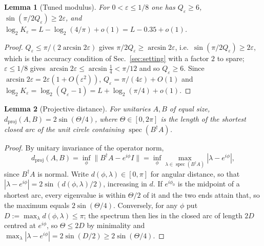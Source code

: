 \documentclass[aps,prx,twocolumn,superscriptaddress,nofootinbib,longbibliography]{revtex4-2}
\theoremstyle{plain}
\newtheorem{lemma}{Lemma}
\theoremstyle{definition}
\theoremstyle{remark}
\newcommand{\dproj}{d_{\mathrm{proj}}}
\DeclareMathOperator{\spec}{spec}
\begin{document}
\begin{lemma}[Tuned modulus]\label{lem:tuned}
For $0<\varepsilon\le1/8$ one has $Q_\varepsilon\ge6$, $\sin(\pi/2Q_\varepsilon)\ge2\varepsilon$, and $\log_2K_\varepsilon=L-\log_2(4/\pi)+o(1)=L-0.35+o(1)$.
\end{lemma}
\begin{proof}
$Q_\varepsilon\le\pi/(2\arcsin2\varepsilon)$ gives $\pi/2Q_\varepsilon\ge\arcsin2\varepsilon$, i.e.\ $\sin(\pi/2Q_\varepsilon)\ge2\varepsilon$, which is the accuracy condition of Sec.~\ref{sec:setting} with a factor $2$ to spare; $\varepsilon\le1/8$ gives $\arcsin2\varepsilon\le\arcsin\tfrac14<\pi/12$ and so $Q_\varepsilon\ge6$. Since $\arcsin2\varepsilon=2\varepsilon(1+O(\varepsilon^2))$, $Q_\varepsilon=\pi/(4\varepsilon)+O(1)$ and $\log_2K_\varepsilon=\log_2(Q_\varepsilon-1)=L+\log_2(\pi/4)+o(1)$.
\end{proof}

\begin{lemma}[Projective distance]\label{lem:dproj}
For unitaries $A,B$ of equal size, $\dproj(A,B)=2\sin(\Theta/4)$, where $\Theta\in[0,2\pi]$ is the length of the shortest closed arc of the unit circle containing $\spec(B^\dagger A)$.
\end{lemma}
\begin{proof}
By unitary invariance of the operator norm,
\[\dproj(A,B)=\inf_\phi\|B^\dagger A-e^{i\phi}I\|=\inf_\phi\max_{\lambda\in\spec(B^\dagger A)}|\lambda-e^{i\phi}|,\]
since $B^\dagger A$ is normal. Write $d(\phi,\lambda)\in[0,\pi]$ for angular distance, so that $|\lambda-e^{i\phi}|=2\sin(d(\phi,\lambda)/2)$, increasing in $d$. If $e^{i\phi_0}$ is the midpoint of a shortest arc, every eigenvalue is within $\Theta/2$ of it and the two ends attain that, so the maximum equals $2\sin(\Theta/4)$. Conversely, for any $\phi$ put $D:=\max_\lambda d(\phi,\lambda)\le\pi$; the spectrum then lies in the closed arc of length $2D$ centred at $e^{i\phi}$, so $\Theta\le2D$ by minimality and $\max_\lambda|\lambda-e^{i\phi}|=2\sin(D/2)\ge2\sin(\Theta/4)$.
\end{proof}
\end{document}
